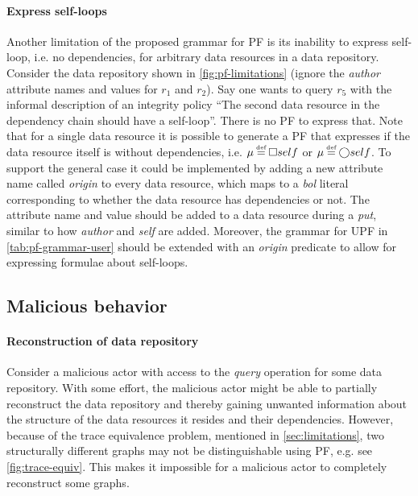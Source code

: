 \paragraph{Express self-loops} Another limitation of the proposed grammar for PF is its inability to express self-loop, i.e. no dependencies, for arbitrary data resources in a data repository. Consider the data repository shown in \autoref{fig:pf-limitations} (ignore the \emph{author} attribute names and values for $r_1$ and $r_2$). Say one wants to query $r_5$ with the informal description of an integrity policy ``The second data resource in the dependency chain should have a self-loop''. There is no PF to express that. Note that for a single data resource it is possible to generate a PF that expresses if the data resource itself is without dependencies, i.e. $\inte \eqdef \G self$ or $\inte \eqdef \X self$. To support the general case it could be implemented by adding a new attribute name called \emph{origin} to every data resource, which maps to a \emph{bol} literal corresponding to whether the data resource has dependencies or not. The attribute name and value should be added to a data resource during a \emph{put}, similar to how \emph{author} and \emph{self} are added. Moreover, the grammar for UPF in \autoref{tab:pf-grammar-user} should be extended with an \emph{origin} predicate to allow for expressing formulae about self-loops.

\subsection{Malicious behavior}
\paragraph{Reconstruction of data repository}
Consider a malicious actor with access to the \emph{query} operation for some data repository. With some effort, the malicious actor might be able to partially reconstruct the data repository and thereby gaining unwanted information about the structure of the data resources it resides and their dependencies. However, because of the trace equivalence problem, mentioned in \autoref{sec:limitations}, two structurally different graphs may not be distinguishable using PF, e.g. see \autoref{fig:trace-equiv}. This makes it impossible for a malicious actor to completely reconstruct some graphs.

